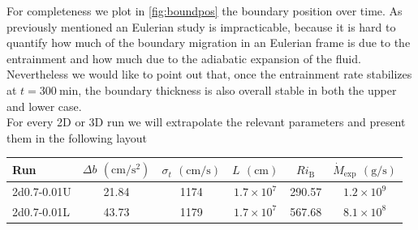For completeness we plot in \ref{fig:boundpos} the boundary position over time. As previously mentioned an Eulerian study is impracticable, because it is hard to quantify how much of the boundary migration in an Eulerian frame is due to the entrainment and how much due to the adiabatic expansion of the fluid. Nevertheless we would like to point out that, once the entrainment rate stabilizes at $t=300 \ \mathrm{min}$, the boundary thickness is also overall stable in both the upper and lower case. \\
For every 2D or 3D run we will extrapolate the relevant parameters and present them in the following layout
\begin{center}
 \begin{tabular}{l|c|c|c|c|c}
	 Run & $\Delta b$  $(\mathrm{cm/s^{2}})$ & $\sigma_t$ $(\mathrm{cm/s})$ & $L$ $(\mathrm{cm})$ & $Ri_{\mathrm{B}}$ & $\dot{M}_{\mathrm{exp}}$ $(\mathrm{g/s})$\\
	  	\hline
		2d0.7-0.01U & 21.84 & 1174 & $1.7 \times 10^{7}$ & 290.57  & $1.2 \times 10^{9}$ \\
		\hline
		2d0.7-0.01L & 43.73 & 1179 & $1.7 \times 10^{7}$ & 567.68 & $8.1 \times 10^{8}$ \\ 
      \end{tabular}
 \end{center}

